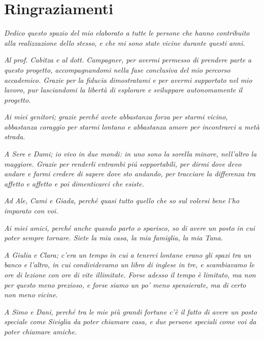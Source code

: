 \chapter*{Ringraziamenti}
\label{ch:ringraziamenti}

\textit{Dedico questo spazio del mio elaborato a tutte le persone che hanno contribuito alla realizzazione dello stesso, e che mi sono state vicine durante questi anni.}

\textit{Al prof. Cabitza e al dott. Campagner, per avermi permesso di prendere parte a questo progetto, accompagnandomi nella fase conclusiva del mio percorso accademico. Grazie per la fiducia dimostratami e per avermi supportato nel mio lavoro, pur lasciandomi la libertà di esplorare e sviluppare autonomamente il progetto.}

\textit{Ai miei genitori; grazie perché avete abbastanza forza per starmi vicino, abbastanza coraggio per starmi lontano e abbastanza amore per incontrarci a metà strada.}

\textit{A Sere e Dami; io vivo in due mondi: in uno sono la sorella minore, nell'altro la maggiore. Grazie per renderli entrambi piú sopportabili, per dirmi dove devo andare e farmi credere di sapere dove sto andando, per tracciare la differenza tra affetto e affetto e poi dimenticarci che esiste.}

\textit{Ad Ale, Cami e Giada, perché quasi tutto quello che so sul volersi bene l'ho imparato con voi.}

\textit{Ai miei amici, perché anche quando parto o sparisco, so di avere un posto in cui poter sempre tornare. Siete la mia casa, la mia famiglia, la mia Tana.}

\textit{A Giulia e Clara; c'era un tempo in cui a tenerci lontane erano gli spazi tra un banco e l'altro, in cui condividevamo un libro di inglese in tre, e scambiavamo le ore di lezione con ore di vite illimitate. Forse adesso il tempo è limitato, ma non per questo meno prezioso, e forse siamo un po' meno spensierate, ma di certo non meno vicine.}

\textit{A Simo e Dani, perché tra le mie più grandi fortune c'è il fatto di avere un posto speciale come Siviglia da poter chiamare casa, e due persone speciali come voi da poter chiamare amiche.}